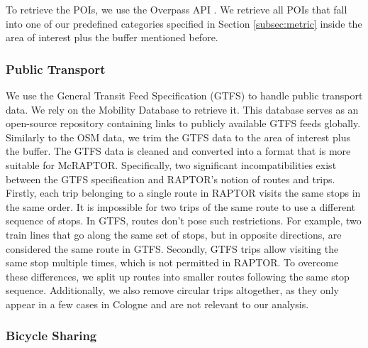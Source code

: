 To retrieve the POIs, we use the Overpass API .
We retrieve all POIs that fall into one of our predefined categories specified in Section \ref{subsec:metric} inside the area of interest plus the buffer mentioned before.

\subsubsection{Public Transport}
\label{subs:public_transport}

We use the General Transit Feed Specification (GTFS)  to handle public transport data.
We rely on the Mobility Database  to retrieve it.
This database serves as an open-source repository containing links to publicly available GTFS feeds globally.
Similarly to the OSM data, we trim the GTFS data to the area of interest plus the buffer.
The GTFS data is cleaned and converted into a format that is more suitable for McRAPTOR.
Specifically, two significant incompatibilities exist between the GTFS specification and RAPTOR's notion of routes and trips.
Firstly, each trip belonging to a single route in RAPTOR visits the same stops in the same order.
It is impossible for two trips of the same route to use a different sequence of stops.
In GTFS, routes don't pose such restrictions.
For example, two train lines that go along the same set of stops, but in opposite directions, are considered the same route in GTFS.
Secondly, GTFS trips allow visiting the same stop multiple times, which is not permitted in RAPTOR.
To overcome these differences, we split up routes into smaller routes following the same stop sequence.
Additionally, we also remove circular trips altogether, as they only appear in a few cases in Cologne and are not relevant to our analysis.


\subsubsection{Bicycle Sharing}
\label{subs:bicycle_sharing}

